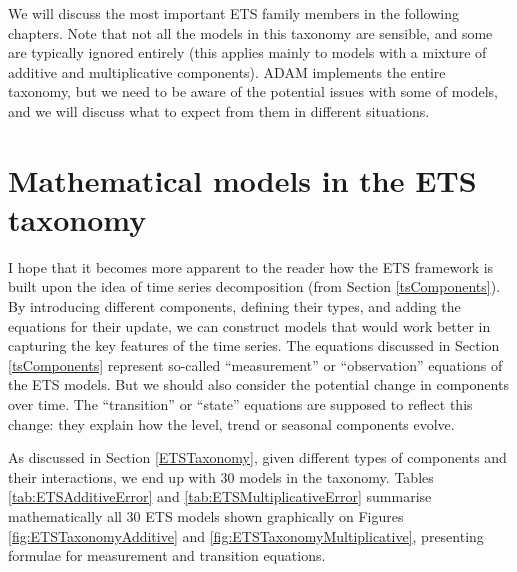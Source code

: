 \documentclass[
]{book}
\theoremstyle{definition}
\theoremstyle{definition}
\theoremstyle{definition}
\theoremstyle{definition}
\theoremstyle{remark}
\begin{document}
We will discuss the most important ETS family members in the following chapters. Note that not all the models in this taxonomy are sensible, and some are typically ignored entirely (this applies mainly to models with a mixture of additive and multiplicative components). ADAM implements the entire taxonomy, but we need to be aware of the potential issues with some of models, and we will discuss what to expect from them in different situations.

\hypertarget{ETSTaxonomyMaths}{%
\section{Mathematical models in the ETS taxonomy}\label{ETSTaxonomyMaths}}

I hope that it becomes more apparent to the reader how the ETS framework is built upon the idea of time series decomposition (from Section \ref{tsComponents}). By introducing different components, defining their types, and adding the equations for their update, we can construct models that would work better in capturing the key features of the time series. The equations discussed in Section \ref{tsComponents} represent so-called ``measurement'' or ``observation'' equations of the ETS models. But we should also consider the potential change in components over time. The ``transition'' or ``state'' equations are supposed to reflect this change: they explain how the level, trend or seasonal components evolve.

As discussed in Section \ref{ETSTaxonomy}, given different types of components and their interactions, we end up with 30 models in the taxonomy. Tables \ref{tab:ETSAdditiveError} and \ref{tab:ETSMultiplicativeError} summarise mathematically all 30 ETS models shown graphically on Figures \ref{fig:ETSTaxonomyAdditive} and \ref{fig:ETSTaxonomyMultiplicative}, presenting formulae for measurement and transition equations.
\end{document}
